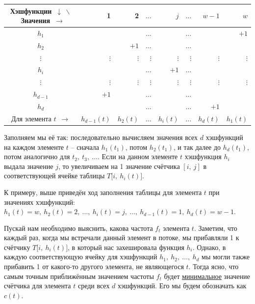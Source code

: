 \documentclass[a4paper,12pt]{article}
\begin{document}
\begin{center}
\begin{tabular}{||c||*{7}{r|}|}
\hline
\hline
Хэшфункции\ $\downarrow\ \backslash$\ Значения\ $\rightarrow$& 1 & 2 & $\ldots$ &$j$ & $\ldots$ & $w - 1$ & $w$ \\
\hline
\hline
$h_1$ & & &$\ldots$ & &$\ldots$ & &$+1$\\
\hline
$h_2$ & &$+1$ &$\ldots$ & &$\ldots$ & &\\
\hline
$\vdots$ &$\vdots$ & $\vdots$&$\vdots$&$\vdots$ &$\vdots$ & $\vdots$&$\vdots$\\
\hline
$h_i$ & & &$\ldots$ & $+ 1$ &$\ldots$ & &\\
\hline
$\vdots$ &$\vdots$ & $\vdots$&$\vdots$& $\vdots$&$\vdots$ & $\vdots$&$\vdots$\\
\hline
$h_{d - 1}$ &$+1$ & &$\ldots$ & &$\ldots$ & &\\
\hline
$h_d$ & & &$\ldots$ & &$\ldots$ &$+1$ &\\
\hline
\hline
Для элемента $t$\ $\rightarrow$ &$h_{d - 1}(t)$ &$h_2(t)$ &$\ldots$ &$h_i(t)$ &$\ldots$ &$h_d(t)$ &$h_1(t)$\\
\hline
\hline
\end{tabular}\end{center}
 
Заполняем мы её так: последовательно вычисляем значения всех $d$ хэшфункций на каждом элементе $t$ -- сначала $h_1(t_1)$, потом $h_2(t_1)$, и так далее до $h_d(t_1)$, потом аналогично для $t_2,\ t_3,\ \ldots$. Если на данном элементе $t$ хэшфункция $h_i$ выдала значение $j$, то увеличиваем на 1 значение счётчика $[i,\ j]$ в соответствующей ячейке таблицы $T\big[i,\ h_i(t)\big]$.
 
К примеру, выше приведён ход заполнения таблицы для элемента $t$ при значениях хэшфункций: $h_1(t) = w,\ h_2(t) = 2,\ \ldots,\ h_i(t) = j,\ \ldots,\ h_{d - 1}(t) = 1,\ h_d(t) = w - 1$. 

Пускай нам необходимо выяснить, какова частота $f_t$ элемента $t$. Заметим, что каждый раз, когда мы встречали данный элемент в потоке, мы прибавляли 1 к счётчику $T\big[i,\ h_i(t)\big]$, в который нас захешировала функция $h_i$. Однако, в каждую соответствующую ячейку для хэшфункций $h_1,\ h_2,\ \ldots,\ h_d$ мы могли также прибавить 1 от какого-то другого элемента, не являющегося $t$. Тогда ясно, что самым точным приближённым значением частоты $f_t$ будет \underline{минимальное} значение счётчика для элемента $t$ среди всех $d$ хэшфункций. Его мы будем обозначать как $c(t)$.
\end{document}
